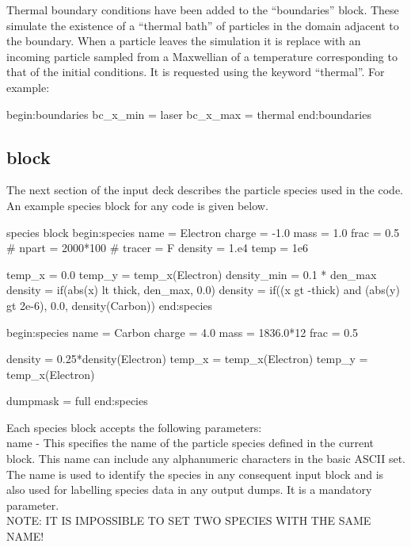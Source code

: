 Thermal boundary conditions have been added to the ``boundaries'' block.
These simulate the existence of a ``thermal bath'' of particles in the
domain adjacent to the boundary. When a particle leaves the simulation it is
replace with an incoming particle sampled from a Maxwellian of a temperature
corresponding to that of the initial conditions. It is requested using the
keyword ``thermal''.
For example:

\begin{boxverbatim}
begin:boundaries
   bc_x_min = laser
   bc_x_max = thermal
end:boundaries
\end{boxverbatim}


\subsection{\texorpdfstring
  { block}
  {           {species} block}}
\label{sec:species_block}
The next section of the input deck describes the particle species used in the
code. An example species block for any {\EPOCH} code is given below.
\begin{lboxverbatim}{species block}
begin:species
   name = Electron
   charge = -1.0
   mass = 1.0
   frac = 0.5
   # npart = 2000*100
   # tracer = F
   density = 1.e4
   temp = 1e6

   temp_x = 0.0
   temp_y = temp_x(Electron)
   density_min = 0.1 * den_max
   density = if(abs(x) lt thick, den_max, 0.0)
   density = if((x gt -thick) and (abs(y) gt 2e-6), 0.0, density(Carbon))
end:species

begin:species
   name = Carbon
   charge = 4.0
   mass = 1836.0*12
   frac = 0.5

   density = 0.25*density(Electron)
   temp_x = temp_x(Electron)
   temp_y = temp_x(Electron)

   dumpmask = full
end:species
\end{lboxverbatim}

Each species block accepts the following parameters:\\

{\emphtext name} - This specifies the name of the particle species defined
in the current block. This name can include any alphanumeric characters in
the basic ASCII set. The name is used to identify the species in any
consequent input block and is also used for labelling species data in any
output dumps. It is a mandatory parameter.\\

{\emphtext NOTE: IT IS IMPOSSIBLE TO SET TWO SPECIES WITH THE SAME NAME!} \\

